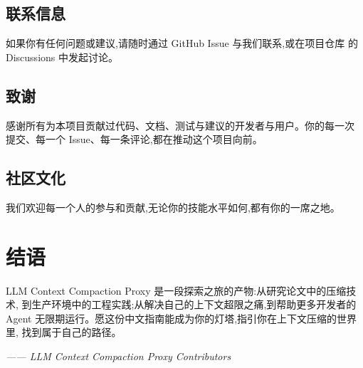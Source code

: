 \documentclass[11pt,a4paper]{article}
\begin{document}
\subsection{联系信息}

如果你有任何问题或建议,请随时通过 GitHub Issue 与我们联系,或在项目仓库
的 Discussions 中发起讨论。

\subsection{致谢}

感谢所有为本项目贡献过代码、文档、测试与建议的开发者与用户。你的每一次
提交、每一个 Issue、每一条评论,都在推动这个项目向前。

\subsection{社区文化}

我们欢迎每一个人的参与和贡献,无论你的技能水平如何,都有你的一席之地。

\section*{结语}

LLM Context Compaction Proxy 是一段探索之旅的产物:从研究论文中的压缩技术,
到生产环境中的工程实践;从解决自己的上下文超限之痛,到帮助更多开发者的
Agent 无限期运行。愿这份中文指南能成为你的灯塔,指引你在上下文压缩的世界里,
找到属于自己的路径。

\vspace{1em}
\noindent \emph{—— LLM Context Compaction Proxy Contributors}
\end{document}
